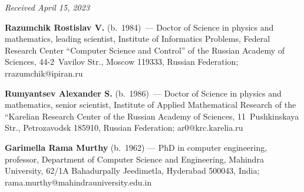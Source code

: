 \vspace*{-6pt}

\hfill{\small\textit{Received April 15, 2023}} 

\Contr


\noindent
\textbf{Razumchik Rostislav V.} (b.\ 1984)~---
Doctor of Science in physics and mathematics, leading scientist,
Institute of Informatics Problems, Federal Research Center ``Computer Science and Control'' 
of the Russian Academy of Sciences, 44-2~Vavilov Str., Moscow 119333, Russian Federation; \mbox{rrazumchik@ipiran.ru}


\vspace*{3pt}

\noindent
\textbf{Rumyantsev Alexander S.} (b.\ 1986)~---
Doctor of Science in physics and mathematics, senior scientist,
Institute of Applied Mathematical Research of the 
``Karelian Research Center of the Russian Academy of Sciences, 11~Pushkinskaya Str., Petrozavodsk 185910, Russian Federation; \mbox{ar0@krc.karelia.ru}

\vspace*{3pt}

\noindent
\textbf{Garimella Rama Murthy} (b.\ 1962) ---
PhD in computer engineering, professor,
Department of Computer Science and Engineering, Mahindra University, 62/1A
Bahadurpally Jeedimetla, Hyderabad 500043, India; \mbox{rama.murthy@mahindrauniversity.edu.in}



   
\label{end\stat}

\renewcommand{\bibname}{\protect\rm Литература} 